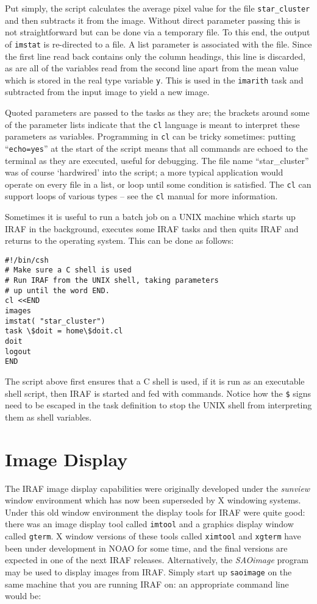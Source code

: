Put simply, the script calculates the average pixel
value for the file {\tt star\_cluster} and then subtracts it from the
image. Without direct parameter passing this is not
straightforward but can be done via a temporary file.
To this end, the output of {\tt imstat} is
re-directed to a file.  A list parameter is associated with the file. Since
the first line read back contains only the column headings, this line
is discarded, as are all of the variables read from the second line
apart from the mean value which is stored in the real type variable
{\tt y}. This
is used in the {\tt imarith} task and subtracted from the input image to
yield a new image.

Quoted parameters are passed to the tasks as they are; the brackets
around some of the parameter lists indicate that the {\tt cl} language is
meant to interpret these parameters as variables.  Programming in {\tt cl}
can be tricky sometimes: putting ``{\tt echo=yes}'' at the start of
the script means that all commands are echoed to the terminal as they
are executed, useful for debugging.  The file name
``star\_cluster'' was of course `hardwired' into the script; a more
typical application would operate on every file in a list, or loop
until some condition is satisfied. The {\tt cl} can support loops of various
types -- see the {\tt cl} manual for more information.

Sometimes it is useful to run a batch job on a UNIX machine which
starts up IRAF in the background, executes some IRAF tasks and then
quits IRAF and returns to the operating system. This can be done as
follows:

{\footnotesize
\begin{verbatim}
#!/bin/csh
# Make sure a C shell is used
# Run IRAF from the UNIX shell, taking parameters
# up until the word END.
cl <<END
images
imstat( "star_cluster")
task \$doit = home\$doit.cl
doit
logout
END
\end{verbatim}
}

The script above first ensures that a C shell is used, if it is run as
an executable shell script, then IRAF is started and fed with
commands. Notice how the {\tt \$} signs need to be escaped in the task
definition to stop the UNIX shell from interpreting them as shell
variables.


\section{Image Display}

The IRAF image display capabilities were originally developed under
the {\it sunview}\/ window environment which has now been superseded by
X windowing systems. Under this old window environment the
display tools for IRAF were quite good: there was an image display
tool called {\tt imtool} and a graphics display window called
{\tt gterm}. X window versions of these tools called {\tt ximtool} and
{\tt xgterm} have been under development in NOAO for some time,
and the final versions are expected in one of the next IRAF releases.
Alternatively, the {\it SAOimage}\/ program may be used to display
images from IRAF. Simply start up {\tt saoimage} on the same machine that
you are running IRAF on:  an appropriate command line would be:


